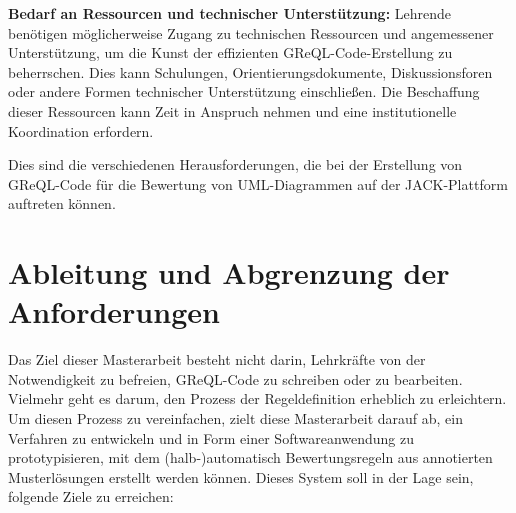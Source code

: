 \vspace{0.5cm}
\textbf{Bedarf an Ressourcen und technischer Unterstützung:}
Lehrende benötigen möglicherweise Zugang zu technischen Ressourcen und angemessener Unterstützung, um die Kunst der effizienten GReQL-Code-Erstellung zu beherrschen. Dies kann Schulungen, Orientierungsdokumente, Diskussionsforen oder andere Formen technischer Unterstützung einschließen. Die Beschaffung dieser Ressourcen kann Zeit in Anspruch nehmen und eine institutionelle Koordination erfordern.

\vspace{0.5cm}
Dies sind die verschiedenen Herausforderungen, die bei der Erstellung von GReQL-Code für die Bewertung von UML-Diagrammen auf der JACK-Plattform auftreten können.


\section{Ableitung und Abgrenzung der Anforderungen}

Das Ziel dieser Masterarbeit besteht nicht darin, Lehrkräfte von der Notwendigkeit zu befreien, GReQL-Code zu schreiben oder zu bearbeiten. Vielmehr geht es darum, den Prozess der Regeldefinition erheblich zu erleichtern. Um diesen Prozess zu vereinfachen, zielt diese Masterarbeit darauf ab, ein Verfahren zu entwickeln und in Form einer Softwareanwendung zu prototypisieren, mit dem (halb-)automatisch Bewertungsregeln aus annotierten Musterlösungen erstellt werden können. Dieses System soll in der Lage sein, folgende Ziele zu erreichen:

